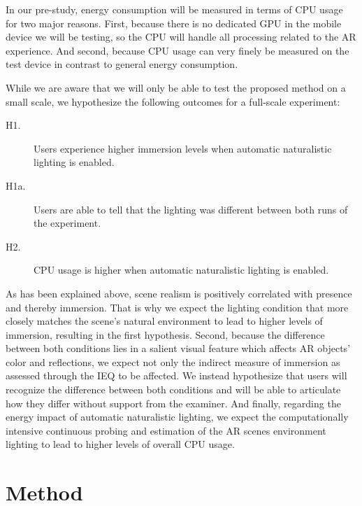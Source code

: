 \documentclass[12pt,twoside,english]{article}
\begin{document}
In our pre-study, energy consumption will be measured in terms of \gls{CPU} usage for two major reasons.
First, because there is no dedicated \gls{GPU} in the mobile device we will be testing, so the \gls{CPU} will handle all processing related to the \gls{AR} experience.
And second, because CPU usage can very finely be measured on the test device in contrast to general energy consumption.

While we are aware that we will only be able to test the proposed method on a small scale, we hypothesize the following outcomes for a full-scale experiment:

\begin{description}
    \item[H1.] Users experience higher immersion levels when automatic naturalistic lighting is enabled.
    \item[H1a.] Users are able to tell that the lighting was different between both runs of the experiment.
    \item[H2.] \gls{CPU} usage is higher when automatic naturalistic lighting is enabled.
\end{description}

As has been explained above, scene realism is positively correlated with presence and thereby immersion.
That is why we expect the lighting condition that more closely matches the scene's natural environment to lead to higher levels of immersion, resulting in the first hypothesis.
Second, because the difference between both conditions lies in a salient visual feature which affects \gls{AR} objects' color and reflections, we expect not only the indirect measure of immersion as assessed through the \gls{IEQ} to be affected.
We instead hypothesize that users will recognize the difference between both conditions and will be able to articulate how they differ without support from the examiner.
And finally, regarding the energy impact of automatic naturalistic lighting, we expect the computationally intensive continuous probing and estimation of the \gls{AR} scenes environment lighting to lead to higher levels of overall \gls{CPU} usage.


\section{Method}
\label{sect:method}
\end{document}
